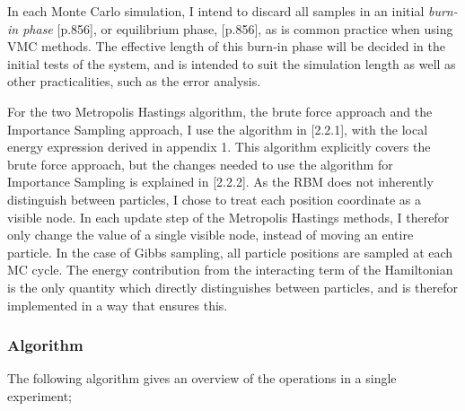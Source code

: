\documentclass[%
oneside,                 %
final,                   %
10pt]{article}
\begin{document}
In each Monte Carlo simulation, I intend to discard all samples in an initial \textit{burn-in phase} \citep{MLMurphy}[p.856], or equilibrium phase, \citep{MLMurphy}[p.856], as is common practice when using VMC methods. The effective length of this burn-in phase will be decided in the initial tests of the system, and is intended to suit the simulation length as well as other practicalities, such as the error analysis.

For the two Metropolis Hastings algorithm, the brute force approach and the Importance Sampling approach, I use the algorithm in \cite{JN_P1}[2.2.1], with the local energy expression derived in appendix 1. This algorithm explicitly covers the brute force approach, but the changes needed to use the algorithm for Importance Sampling is explained in \cite{JN_P1}[2.2.2]. As the RBM does not inherently distinguish between particles, I chose to treat each position coordinate as a visible node. In each update step of the Metropolis Hastings methods, I therefor only change the value of a single visible node, instead of moving an entire particle. In the case of Gibbs sampling, all particle positions are sampled at each MC cycle. The energy contribution from the interacting term of the Hamiltonian is the only quantity which directly distinguishes between particles, and is therefor implemented in a way that ensures this. 
 
\subsubsection{Algorithm}
The following algorithm gives an overview of the operations in a single experiment;
\begin{center}\end{center}
\end{document}
